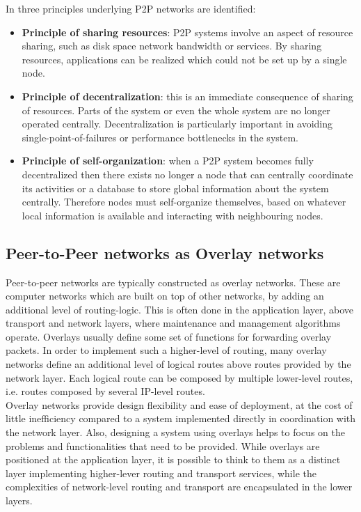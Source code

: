 In \cite{Aberer02anoverview} three principles underlying P2P networks are identified:
\begin{itemize}
\item \textbf{Principle of sharing resources}: P2P systems involve an aspect of resource sharing, such as disk space network bandwidth or services. By sharing resources, applications can be realized which could not be set up by a single node.
\item \textbf{Principle of decentralization}: this is an immediate consequence of sharing of resources. Parts of the system or even the whole system are no longer operated centrally. Decentralization is particularly important in avoiding single-point-of-failures or performance bottlenecks in the system.
\item \textbf{Principle of self-organization}: when a P2P system becomes fully decentralized then there exists no longer a node that can centrally coordinate its activities or a database to store global information about the system centrally. Therefore nodes must self-organize themselves, based on whatever local information is available and interacting with neighbouring nodes.
\end{itemize}




\subsection{Peer-to-Peer networks as Overlay networks}
Peer-to-peer networks are typically constructed as overlay networks. These are computer networks which are built on top of other networks, by adding an additional level of routing-logic. This is often done in the application layer, above transport and network layers, where maintenance and management algorithms operate. Overlays usually define some set of functions for forwarding overlay packets. In order to implement such a higher-level of routing, many overlay networks define an additional level of logical routes above routes provided by the network layer. Each logical route can be composed by multiple lower-level routes, i.e. routes composed by several IP-level routes.
\\

Overlay networks provide design flexibility and ease of deployment, at the cost of little inefficiency compared to a system implemented directly in coordination with the network layer. Also, designing a system using overlays helps to focus on the problems and functionalities that need to be provided. While overlays are positioned at the application layer, it is possible to think to them as a distinct layer implementing higher-lever routing and transport services, while the complexities of network-level routing and transport are encapsulated in the lower layers.
\\

